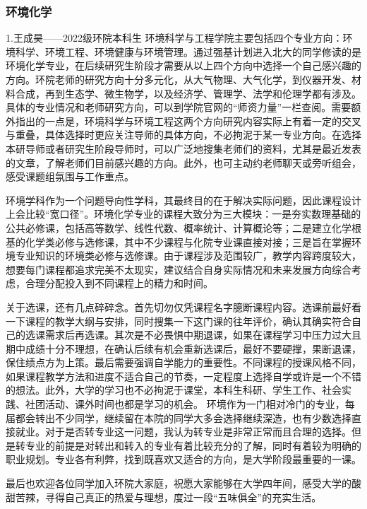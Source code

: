 \documentclass[11pt,oneside]{book}
\begin{document}
\newpage

\subsubsection{环境化学}

1.王成昊——2022级环院本科生
环境科学与工程学院主要包括四个专业方向：环境科学、环境工程、环境健康与环境管理。通过强基计划进入北大的同学修读的是环境化学专业，在后续研究生阶段才需要从以上四个方向中选择一个自己感兴趣的方向。环院老师的研究方向十分多元化，从大气物理、大气化学，到仪器开发、材料合成，再到生态学、微生物学，以及经济学、管理学、法学和伦理学都有涉及。具体的专业情况和老师研究方向，可以到学院官网的“师资力量”一栏查阅。需要额外指出的一点是，环境科学与环境工程这两个方向研究内容实际上有着一定的交叉与重叠，具体选择时更应关注导师的具体方向，不必拘泥于某一专业方向。在选择本研导师或者研究生阶段导师时，可以广泛地搜集老师们的资料，尤其是最近发表的文章，了解老师们目前感兴趣的方向。此外，也可主动约老师聊天或旁听组会，感受课题组氛围与工作重点。

环境学科作为一个问题导向性学科，其最终目的在于解决实际问题，因此课程设计上会比较“宽口径”。环境化学专业的课程大致分为三大模块：一是夯实数理基础的公共必修课，包括高等数学、线性代数、概率统计、计算概论等；二是建立化学根基的化学类必修与选修课，其中不少课程与化院专业课直接对接；三是旨在掌握环境专业知识的环境类必修与选修课。由于课程涉及范围较广，教学内容跨度较大，想要每门课程都追求完美不太现实，建议结合自身实际情况和未来发展方向综合考虑，合理分配投入到不同课程上的精力和时间。

关于选课，还有几点碎碎念。首先切勿仅凭课程名字臆断课程内容。选课前最好看一下课程的教学大纲与安排，同时搜集一下这门课的往年评价，确认其确实符合自己的选课需求后再选课。其次是不必畏惧中期退课，如果在课程学习中压力过大且期中成绩十分不理想，在确认后续有机会重新选课后，最好不要硬撑，果断退课，保住绩点方为上策。最后需要强调自学能力的重要性。不同课程的授课风格不同，如果课程教学方法和进度不适合自己的节奏，一定程度上选择自学或许是一个不错的想法。此外，大学的学习也不必拘泥于课堂，本科生科研、学生工作、社会实践、社团活动、课外时间也都是学习的机会。
环境作为一门相对冷门的专业，每届都会转出不少同学，继续留在本院的同学大多会选择继续深造，也有少数选择直接就业。对于是否转专业这一问题，我认为转专业是非常正常而且合理的选择。但是转专业的前提是对转出和转入的专业有着比较充分的了解，同时有着较为明确的职业规划。专业各有利弊，找到既喜欢又适合的方向，是大学阶段最重要的一课。

最后也欢迎各位同学加入环院大家庭，祝愿大家能够在大学四年间，感受大学的酸甜苦辣，寻得自己真正的热爱与理想，度过一段“五味俱全”的充实生活。
\end{document}
